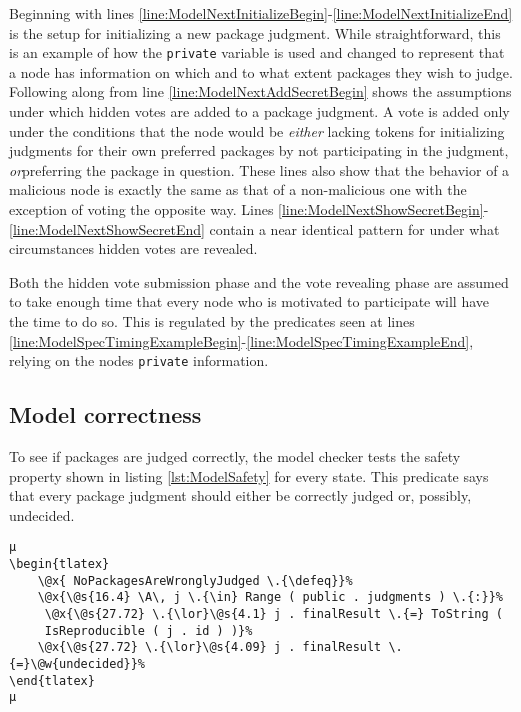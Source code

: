 Beginning with lines \ref{line:ModelNextInitializeBegin}-\ref{line:ModelNextInitializeEnd} is the setup for initializing a new package judgment. While straightforward, this is an example of how the \texttt{private} variable is used and changed to represent that a node has information on which and to what extent packages they wish to judge. Following along from line \ref{line:ModelNextAddSecretBegin} shows the assumptions under which hidden votes are added to a package judgment. A vote is added only under the conditions that the node would be \emph{either} lacking tokens for initializing judgments for their own preferred packages by not participating in the judgment, \emph{or}preferring the package in question. These lines also show that the behavior of a malicious node is exactly the same as that of a non-malicious one with the exception of voting the opposite way. Lines \ref{line:ModelNextShowSecretBegin}-\ref{line:ModelNextShowSecretEnd} contain a near identical pattern for under what circumstances hidden votes are revealed.

Both the hidden vote submission phase and the vote revealing phase are assumed to take enough time that every node who is motivated to participate will have the time to do so. This is regulated by the predicates seen at lines \ref{line:ModelSpecTimingExampleBegin}-\ref{line:ModelSpecTimingExampleEnd}, relying on the nodes \texttt{private} information.

\subsection{Model correctness}
\label{subsec:ModelModelCorrectness}

To see if packages are judged correctly, the model checker tests the safety property shown in listing \ref{lst:ModelSafety} for every state. This predicate says that every package judgment should either be correctly judged or, possibly, undecided. 

\begin{lstlisting}[caption=Model safety property
    , label=lst:ModelSafety]
µ
\begin{tlatex}
    \@x{ NoPackagesAreWronglyJudged \.{\defeq}}%
    \@x{\@s{16.4} \A\, j \.{\in} Range ( public . judgments ) \.{:}}%
     \@x{\@s{27.72} \.{\lor}\@s{4.1} j . finalResult \.{=} ToString (
     IsReproducible ( j . id ) )}%
    \@x{\@s{27.72} \.{\lor}\@s{4.09} j . finalResult \.{=}\@w{undecided}}%
\end{tlatex}
µ
\end{lstlisting}